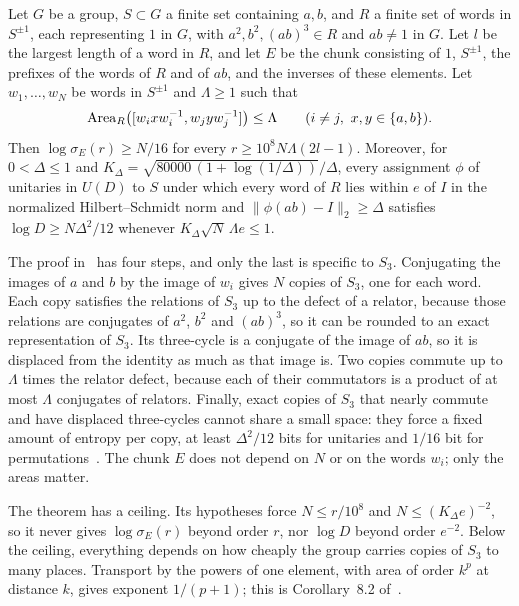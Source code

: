 \begin{theorem}\label{thm:criterion}
Let $G$ be a group, $S\subset G$ a finite set containing $a,b$, and $R$ a finite set of words in $S^{\pm1}$, each representing $1$ in $G$, with
$a^2,b^2,(ab)^3\in R$ and $ab\ne1$ in $G$. Let $l$ be the largest length of a word in $R$, and let $E$ be the chunk consisting of $1$, $S^{\pm1}$,
the prefixes of the words of $R$ and of $ab$, and the inverses of these elements. Let $w_1,\dots,w_N$ be words in $S^{\pm1}$ and $\Lambda\ge1$ such
that
\[
\operatorname{Area}_R\bigl([w_ixw_i^{-1},w_jyw_j^{-1}]\bigr)\le\Lambda\qquad(i\ne j,\ x,y\in\{a,b\}).
\]
Then $\log\sigma_E(r)\ge N/16$ for every $r\ge10^8N\Lambda(2l-1)$. Moreover, for $0<\Delta\le1$ and
$K_\Delta=\sqrt{80000\,(1+\log(1/\Delta))}/\Delta$, every assignment $\phi$ of unitaries in $U(D)$ to $S$ under which every word of $R$ lies
within $e$ of $I$ in the normalized Hilbert--Schmidt norm and $\|\phi(ab)-I\|_2\ge\Delta$ satisfies $\log D\ge N\Delta^2/12$ whenever
$K_\Delta\sqrt N\,\Lambda e\le1$.
\end{theorem}

The proof in~\cite{DouglasMghirbiA} has four steps, and only the last is specific to $S_3$. Conjugating the images of $a$ and $b$ by the image
of $w_i$ gives $N$ copies of $S_3$, one for each word. Each copy satisfies the relations of $S_3$ up to the defect of a relator, because those
relations are conjugates of $a^2$, $b^2$ and $(ab)^3$, so it can be rounded to an exact representation of $S_3$. Its three-cycle is a conjugate
of the image of $ab$, so it is displaced from the identity as much as that image is. Two copies commute up to $\Lambda$ times the relator defect,
because each of their commutators is a product of at most $\Lambda$ conjugates of relators. Finally, exact copies of $S_3$ that nearly commute
and have displaced three-cycles cannot share a small space: they force a fixed amount of entropy per copy, at least $\Delta^2/12$ bits for
unitaries and $1/16$ bit for permutations~\cite[Section~4]{DouglasMghirbiA}. The chunk $E$ does not depend on $N$ or on the words $w_i$; only
the areas matter.

The theorem has a ceiling. Its hypotheses force $N\le r/10^8$ and $N\le(K_\Delta e)^{-2}$, so it never gives $\log\sigma_E(r)$ beyond order $r$,
nor $\log D$ beyond order $e^{-2}$. Below the ceiling, everything depends on how cheaply the group carries copies of $S_3$ to many places.
Transport by the powers of one element, with area of order $k^p$ at distance $k$, gives exponent $1/(p+1)$; this is Corollary~8.2
of~\cite{DouglasMghirbiA}.

